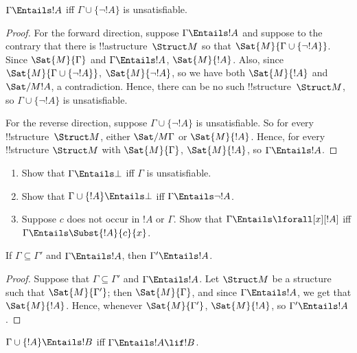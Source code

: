 \documentclass[../../../include/open-logic-section]{subfiles}
\begin{document}
\begin{prop}
$\Gamma \Entails !A$ iff $\Gamma \cup \{\lnot !A\}$ is unsatisfiable.
\end{prop}

\begin{proof}
For the forward direction, suppose $\Gamma \Entails !A$ and suppose to the
contrary that there is !!a{structure}~$\Struct M$ so that $\Sat{M}{\Gamma
  \cup \{ \lnot !A \}}$. Since $\Sat{M}{\Gamma}$ and $\Gamma \Entails
!A$, $\Sat{M}{!A}$. Also, since $\Sat{M}{\Gamma\cup \{ \lnot !A \}}$,
$\Sat{M}{\lnot !A}$, so we have both $\Sat{M}{!A}$ and $\Sat/{M}{!A}$,
a contradiction. Hence, there can be no such !!{structure}~$\Struct M$, so
$\Gamma \cup \{ \lnot !A \}$ is unsatisfiable.

For the reverse direction, suppose $\Gamma \cup \{ \lnot !A \}$ is
unsatisfiable. So for every !!{structure}~$\Struct M$, either
$\Sat/{M}{\Gamma}$ or $\Sat{M}{!A}$. Hence, for every !!{structure}
$\Struct M$ with $\Sat{M}{\Gamma}$, $\Sat{M}{!A}$, so $\Gamma \Entails
!A$.
\end{proof}

\begin{prob}
\begin{enumerate}
\item Show that $\Gamma \Entails \bot$ iff $\Gamma$ is unsatisfiable.
\item Show that $\Gamma \cup \{!A\} \Entails \bot$ iff $\Gamma \Entails \lnot !A$.
\item Suppose $c$ does not occur in $!A$ or $\Gamma$.  Show that
  $\Gamma \Entails \lforall[x][!A]$ iff $\Gamma \Entails
  \Subst{!A}{c}{x}$.
\end{enumerate}
\end{prob}

\begin{prop}
If $\Gamma \subseteq \Gamma'$ and $\Gamma \Entails !A$, then $\Gamma'
\Entails !A$.
\end{prop}

\begin{proof}
Suppose that $\Gamma \subseteq \Gamma'$ and $\Gamma \Entails !A$. Let
$\Struct M$ be a structure such that $\Sat{M}{\Gamma'}$; then $\Sat{M}{\Gamma}$,
and since $\Gamma \Entails !A$, we get that $\Sat{M}{!A}$. Hence,
whenever $\Sat{M}{\Gamma'}$, $\Sat{M}{!A}$, so $\Gamma' \Entails !A$.
\end{proof}


\begin{thm}
$\Gamma \cup \{!A\} \Entails !B$ iff $\Gamma \Entails !A \lif !B$.
\end{thm}
\end{document}
